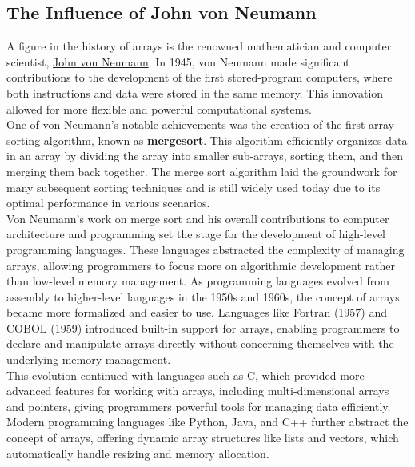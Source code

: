 \documentclass[12pt, oneside]{book}
\begin{document}
	\subsection{The Influence of John von Neumann}
	A figure in the history of arrays is the renowned mathematician and computer scientist, \href{https://en.wikipedia.org/wiki/John_von_Neumann#Computer_science}{John von Neumann}. In 1945, von Neumann made significant contributions to the development of the first stored-program computers, where both instructions and data were stored in the same memory. This innovation allowed for more flexible and powerful computational systems.\\One of von Neumann's notable achievements was the creation of the first array-sorting algorithm, known as \textbf{mergesort}. This algorithm efficiently organizes data in an array by dividing the array into smaller sub-arrays, sorting them, and then merging them back together. The merge sort algorithm laid the groundwork for many subsequent sorting techniques and is still widely used today due to its optimal performance in various scenarios.\\Von Neumann’s work on merge sort and his overall contributions to computer architecture and programming set the stage for the development of high-level programming languages. These languages abstracted the complexity of managing arrays, allowing programmers to focus more on algorithmic development rather than low-level memory management.
	As programming languages evolved from assembly to higher-level languages in the 1950s and 1960s, the concept of arrays became more formalized and easier to use. Languages like Fortran (1957) and COBOL (1959) introduced built-in support for arrays, enabling programmers to declare and manipulate arrays directly without concerning themselves with the underlying memory management.\\This evolution continued with languages such as C, which provided more advanced features for working with arrays, including multi-dimensional arrays and pointers, giving programmers powerful tools for managing data efficiently. Modern programming languages like Python, Java, and C++ further abstract the concept of arrays, offering dynamic array structures like lists and vectors, which automatically handle resizing and memory allocation.
\end{document}
